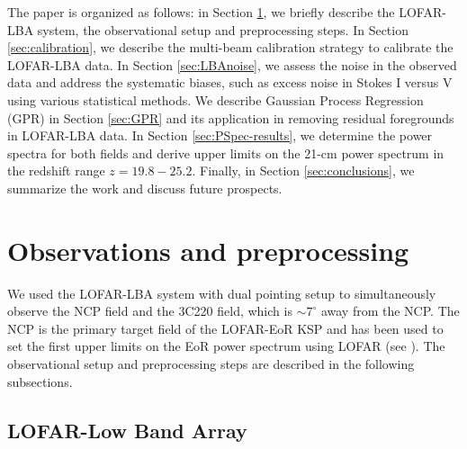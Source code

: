 \documentclass[fleqn,usenatbib]{mnras}
\begin{document}
The paper is organized as follows: in Section \ref{sec:observations_preprocess}, we briefly describe the LOFAR-LBA system, the observational setup and preprocessing steps. In Section \ref{sec:calibration}, we describe the multi-beam calibration strategy to calibrate the LOFAR-LBA data. In Section \ref{sec:LBAnoise}, we assess the noise in the observed data and address the systematic biases, such as excess noise in Stokes I versus V using various statistical methods. We describe Gaussian Process Regression (GPR) in Section \ref{sec:GPR} and its application in removing residual foregrounds in LOFAR-LBA data. In Section \ref{sec:PSpec-results}, we determine the power spectra for both fields and derive upper limits on the 21-cm power spectrum in the redshift range $z = 19.8 - 25.2$. Finally, in Section \ref{sec:conclusions}, we summarize the work and discuss future prospects.  


\section{Observations and preprocessing}\label{sec:observations_preprocess}

We used the LOFAR-LBA system with dual pointing setup to simultaneously observe the NCP field and the 3C220 field, which is $\sim 7^{\circ}$ away from the NCP. The NCP is the primary target field of the LOFAR-EoR KSP and has been used to set the first upper limits on the EoR power spectrum using LOFAR (see \citealt{patil2017}). The observational setup and preprocessing steps are described in the following subsections.

\subsection{LOFAR-Low Band Array}\label{subsec:lofar_lba}
\end{document}
